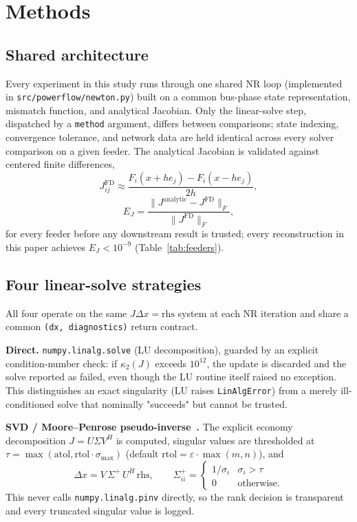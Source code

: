 \documentclass[conference]{IEEEtran}
\begin{document}
\section{Methods}
\label{sec:methods}

\subsection{Shared architecture}
Every experiment in this study runs through one shared NR loop
(implemented in \texttt{src/powerflow/newton.py}) built on a common
bus-phase state representation, mismatch function, and analytical
Jacobian. Only the linear-solve step, dispatched by a \texttt{method}
argument, differs between comparisons; state indexing, convergence
tolerance, and network data are held identical across every solver
comparison on a given feeder. The analytical Jacobian is validated against
centered finite differences,
\begin{equation}
J_{ij}^{\mathrm{FD}} \approx \frac{F_i(x + h e_j) - F_i(x - h e_j)}{2h},
\label{eq:fd}
\end{equation}
\begin{equation}
E_J = \frac{\|J^{\mathrm{analytic}} - J^{\mathrm{FD}}\|_F}{\|J^{\mathrm{FD}}\|_F},
\label{eq:fd-error}
\end{equation}
for every feeder before any downstream result is trusted; every
reconstruction in this paper achieves $E_J < 10^{-9}$ (Table~\ref{tab:feeders}).

\subsection{Four linear-solve strategies}
All four operate on the same $J \Delta x = \mathrm{rhs}$ system at each NR
iteration and share a common \texttt{(dx, diagnostics)} return contract.

\textbf{Direct.} \texttt{numpy.linalg.solve} (LU decomposition), guarded by
an explicit condition-number check: if $\kappa_2(J)$ exceeds $10^{12}$, the
update is discarded and the solve reported as failed, even though the LU
routine itself raised no exception. This distinguishes an exact
singularity (LU raises \texttt{LinAlgError}) from a merely
ill-conditioned solve that nominally "succeeds" but cannot be trusted.

\textbf{SVD / Moore--Penrose pseudo-inverse~\cite{penrose1955generalized}.} The explicit economy
decomposition $J = U \Sigma V^{H}$ is computed, singular values are
thresholded at $\tau = \max(\text{atol}, \text{rtol} \cdot \sigma_{\max})$
(default $\text{rtol} = \varepsilon \cdot \max(m,n)$), and
\begin{equation}
\Delta x = V \, \Sigma^{+} \, U^{H} \, \mathrm{rhs}, \qquad
\Sigma^{+}_{ii} = \begin{cases} 1/\sigma_i & \sigma_i > \tau \\ 0 & \text{otherwise.} \end{cases}
\label{eq:svd}
\end{equation}
This never calls \texttt{numpy.linalg.pinv} directly, so the rank decision
is transparent and every truncated singular value is logged.
\end{document}
